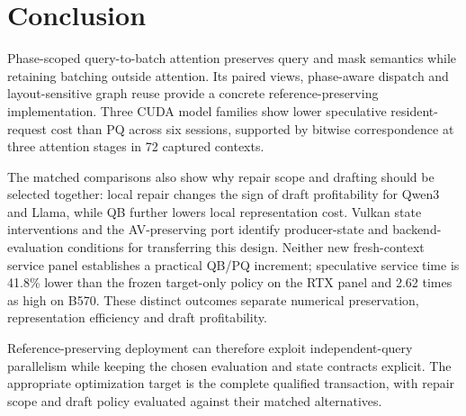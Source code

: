 \section{Conclusion}
Phase-scoped query-to-batch attention preserves query and mask semantics while retaining batching outside attention. Its paired views, phase-aware dispatch and layout-sensitive graph reuse provide a concrete reference-preserving implementation. Three CUDA model families show lower speculative resident-request cost than PQ across six sessions, supported by bitwise correspondence at three attention stages in 72 captured contexts.

The matched comparisons also show why repair scope and drafting should be selected together: local repair changes the sign of draft profitability for Qwen3 and Llama, while QB further lowers local representation cost. Vulkan state interventions and the AV-preserving port identify producer-state and backend-evaluation conditions for transferring this design. Neither new fresh-context service panel establishes a practical QB/PQ increment; speculative service time is 41.8\% lower than the frozen target-only policy on the RTX panel and 2.62 times as high on B570. These distinct outcomes separate numerical preservation, representation efficiency and draft profitability.

Reference-preserving deployment can therefore exploit independent-query parallelism while keeping the chosen evaluation and state contracts explicit. The appropriate optimization target is the complete qualified transaction, with repair scope and draft policy evaluated against their matched alternatives.
